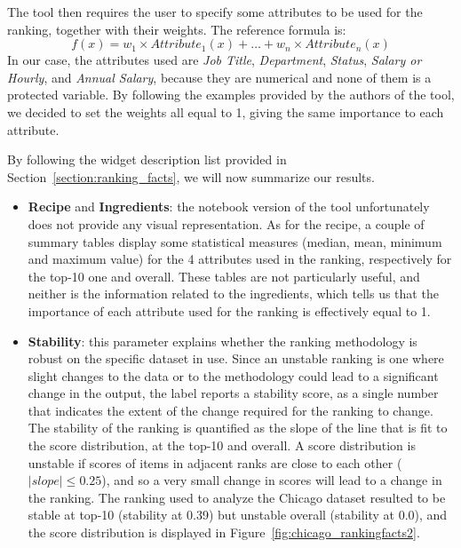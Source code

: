 The tool then requires the user to specify some attributes to be used for the ranking, together with their weights. The reference formula is: \[f(x) = w_1 \times \mathit{Attribute}_1(x) + \ldots + w_n \times \mathit{Attribute}_n(x)\]
In our case, the attributes used are \textit{Job Title}, \textit{Department}, \textit{Status}, \textit{Salary or Hourly}, and \textit{Annual Salary}, because they are numerical and none of them is a protected variable. By following the examples provided by the authors of the tool, we decided to set the weights all equal to 1, giving the same importance to each attribute.

By following the widget description list provided in Section~\ref{section:ranking_facts}, we will now summarize our results.
\begin{itemize}
\item \textbf{Recipe} and \textbf{Ingredients}: the notebook version of the tool unfortunately does not provide any visual representation. As for the recipe, a couple of summary tables display some statistical measures (median, mean, minimum and maximum value) for the 4 attributes used in the ranking, respectively for the top-10 one and overall. These tables are not particularly useful, and neither is the information related to the ingredients, which tells us that the importance of each attribute used for the ranking is effectively equal to 1.
\item \textbf{Stability}: this parameter explains whether the ranking methodology is robust on the specific dataset in use. Since an unstable ranking is one where slight changes to the data or to the methodology could lead to a significant change in the output, the label reports a stability score, as a single number that indicates the extent of the change required for the ranking to change. The stability of the ranking is quantified as the slope of the line that is fit to the score distribution, at the top-10 and overall. A score distribution is unstable if scores of items in adjacent ranks are close to each other (\(|\mathit{slope}| \leq 0.25\)), and so a very small change in scores will lead to a change in the ranking. The ranking used to analyze the Chicago dataset resulted to be stable at top-10 (stability at 0.39) but unstable overall (stability at 0.0), and the score distribution is displayed in Figure~\ref{fig:chicago_rankingfacts2}.


\end{itemize}

